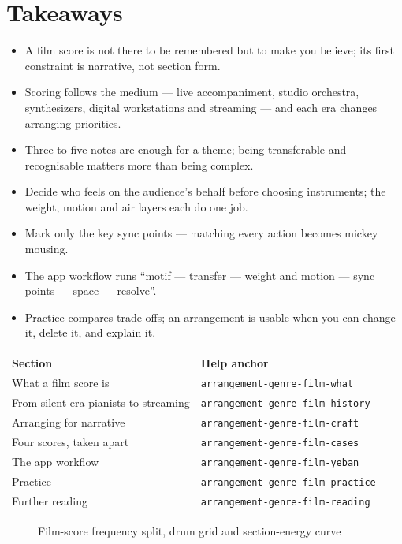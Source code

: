 \section{Takeaways}
\label{sec:film-takeaways}

\begin{itemize}
\item A film score is not there to be remembered but to make you believe; its first constraint is narrative, not section form.
\item Scoring follows the medium --- live accompaniment, studio orchestra, synthesizers, digital workstations and streaming --- and each era changes arranging priorities.
\item Three to five notes are enough for a theme; being transferable and recognisable matters more than being complex.
\item Decide who feels on the audience's behalf before choosing instruments; the weight, motion and air layers each do one job.
\item Mark only the key sync points --- matching every action becomes mickey mousing.
\item The app workflow runs ``motif --- transfer --- weight and motion --- sync points --- space --- resolve''.
\item Practice compares trade-offs; an arrangement is usable when you can change it, delete it, and explain it.
\end{itemize}

\begin{helpmapping}
\begin{longtable}{p{}p{}}
\toprule
Section & Help anchor \\
\midrule
What a film score is & \texttt{arrangement-genre-film-what} \\
From silent-era pianists to streaming & \texttt{arrangement-genre-film-history} \\
Arranging for narrative & \texttt{arrangement-genre-film-craft} \\
Four scores, taken apart & \texttt{arrangement-genre-film-cases} \\
The app workflow & \texttt{arrangement-genre-film-yeban} \\
Practice & \texttt{arrangement-genre-film-practice} \\
Further reading & \texttt{arrangement-genre-film-reading} \\
\bottomrule
\end{longtable}
\end{helpmapping}

\begin{figure}[htbp]\centering
{}
\caption{Film-score frequency split, drum grid and section-energy curve}
\end{figure}
